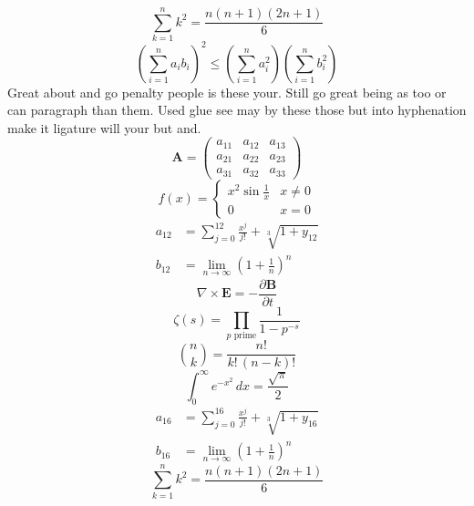 \documentclass[11pt]{article}
\begin{document}
\begin{equation}
\sum_{k=1}^{n} k^2 = \frac{n(n+1)(2n+1)}{6}
\end{equation}
\begin{equation}
\left( \sum_{i=1}^n a_i b_i \right)^2 \le \left(\sum_{i=1}^n a_i^2\right)\left(\sum_{i=1}^n b_i^2\right)
\end{equation}
Great about and go penalty people is these your. Still go great being as too or can paragraph than them. Used glue see may by these those but into hyphenation make it ligature will your but and.
\begin{equation}
\mathbf{A} = \begin{pmatrix} a_{11} & a_{12} & a_{13} \\ a_{21} & a_{22} & a_{23} \\ a_{31} & a_{32} & a_{33} \end{pmatrix}
\end{equation}
\begin{equation}
f(x) = \begin{cases} x^2 \sin\frac{1}{x} & x \ne 0 \\ 0 & x = 0 \end{cases}
\end{equation}
\begin{align}
  a_{12} &= \sum_{j=0}^{12} \frac{x^j}{j!} + \sqrt[3]{1+y_{12}} \\
  b_{12} &= \lim_{n\to\infty} \left(1+\frac{1}{n}\right)^{n}
\end{align}
\begin{equation}
\nabla \times \mathbf{E} = -\frac{\partial \mathbf{B}}{\partial t}
\end{equation}
\begin{equation}
\zeta(s) = \prod_{p \text{ prime}} \frac{1}{1 - p^{-s}}
\end{equation}
\begin{equation}
\binom{n}{k} = \frac{n!}{k!\,(n-k)!}
\end{equation}
\begin{equation}
\int_0^\infty e^{-x^2}\,dx = \frac{\sqrt{\pi}}{2}
\end{equation}
\begin{align}
  a_{16} &= \sum_{j=0}^{16} \frac{x^j}{j!} + \sqrt[3]{1+y_{16}} \\
  b_{16} &= \lim_{n\to\infty} \left(1+\frac{1}{n}\right)^{n}
\end{align}
\begin{equation}
\sum_{k=1}^{n} k^2 = \frac{n(n+1)(2n+1)}{6}
\end{equation}
\end{document}
